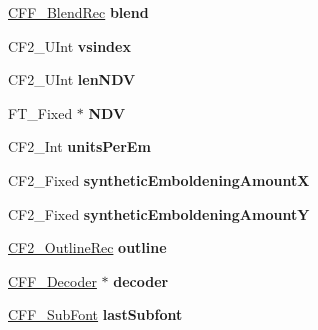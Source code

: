 \begin{DoxyCompactItemize}
\item 
\mbox{\label{struct_c_f2___font_rec___af45433ad7c95c706c242be7b19afca4a}} 
\hyperlink{struct_c_f_f___blend_rec__}{C\+F\+F\+\_\+\+Blend\+Rec} {\bfseries blend}
\item 
\mbox{\label{struct_c_f2___font_rec___af1820332d253b370affee4ebc11e2067}} 
C\+F2\+\_\+\+U\+Int {\bfseries vsindex}
\item 
\mbox{\label{struct_c_f2___font_rec___a9739f3a7a5df869bd41cdafa01b3eebb}} 
C\+F2\+\_\+\+U\+Int {\bfseries len\+N\+DV}
\item 
\mbox{\label{struct_c_f2___font_rec___ac3a366bcbc2156661ac6fe129ff86044}} 
F\+T\+\_\+\+Fixed $\ast$ {\bfseries N\+DV}
\item 
\mbox{\label{struct_c_f2___font_rec___ae5f8ad20f6ad0dff6c123424c6601fc5}} 
C\+F2\+\_\+\+Int {\bfseries units\+Per\+Em}
\item 
\mbox{\label{struct_c_f2___font_rec___acc4d7f71eb418d024965c276f986ab0a}} 
C\+F2\+\_\+\+Fixed {\bfseries synthetic\+Emboldening\+AmountX}
\item 
\mbox{\label{struct_c_f2___font_rec___a8cc6ae4a09571c74c7798e61441e2e88}} 
C\+F2\+\_\+\+Fixed {\bfseries synthetic\+Emboldening\+AmountY}
\item 
\mbox{\label{struct_c_f2___font_rec___a93bf907cfd7193d5bc34fe3c1974735d}} 
\hyperlink{struct_c_f2___outline_rec__}{C\+F2\+\_\+\+Outline\+Rec} {\bfseries outline}
\item 
\mbox{\label{struct_c_f2___font_rec___a28a6d942bedbffc6625036d38d8a4076}} 
\hyperlink{struct_c_f_f___decoder__}{C\+F\+F\+\_\+\+Decoder} $\ast$ {\bfseries decoder}
\item 
\mbox{\label{struct_c_f2___font_rec___ad255d134a21eff55259a820d7cb3fb3b}} 
\hyperlink{struct_c_f_f___sub_font_rec__}{C\+F\+F\+\_\+\+Sub\+Font} {\bfseries last\+Subfont}
\item 

\end{DoxyCompactItemize}
